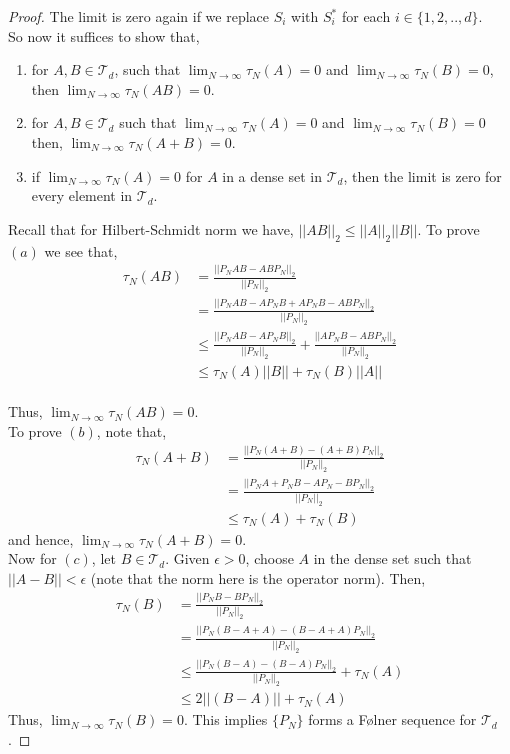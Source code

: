 \documentclass[article]{amsart}
\begin{document}
\begin{proof}
    The limit is zero again if we replace $S_i$ with $S_i^*$ for each $i \in \{1,2,..,d\}$.\\
    
So now it suffices to show that, 
\begin{enumerate}[label=(\alph*)]
\item for $A, B \in \mathcal{T}_d$, such that $\lim_{N\rightarrow \infty} \tau_N(A)=0$ and $\lim_{N\rightarrow \infty} \tau_N(B)=0$, then $\lim_{N \rightarrow \infty} \tau_N(AB)=0$.
\item for $A, B \in \mathcal{T}_d$ such that $\lim_{N\rightarrow \infty} \tau_N(A)=0$ and $\lim_{N\rightarrow \infty} \tau_N(B)=0$ then, $\lim_{N \rightarrow \infty} \tau_N(A+B)=0$.
\item if $\lim_{N\rightarrow \infty} \tau_N(A)=0$ for $A$ in a dense set in $\mathcal{T}_d$, then the limit is zero for every element in $\mathcal{T}_d$.
\end{enumerate}
Recall that for Hilbert-Schmidt norm we have, $||AB||_2 \leq ||A||_2 ||B||$. To prove $(a)$ we see that,
\begin{align*}
    \tau_N(AB) &=  \frac{||P_N AB - AB P_N||_2}{||P_N||_2}\\
    & = \frac{||P_N AB - AP_N B + AP_NB- AB P_N||_2}{||P_N||_2}\\
    & \leq \frac{||P_N AB - AP_N B||_2}{||P_N||_2} + \frac{||AP_N B - ABP_N ||_2}{||P_N||_2}\\
    &  \leq \tau_N(A) ||B|| + \tau_N(B) ||A||
\end{align*}\\
Thus, $\lim_{N \rightarrow \infty} \tau_N(AB)=0$.\\

To prove $(b)$, note that,
\begin{align*}
\tau_N(A+B) & =  \frac{||P_N (A+B) - (A+B) P_N||_2}{||P_N||_2}\\
& =  \frac{||P_N A+ P_NB - A P_N - B P_N||_2}{||P_N||_2}\\
& \leq \tau_N(A) + \tau_N(B)
\end{align*}
and hence, $\lim_{N \rightarrow \infty} \tau_N(A+B)=0$.\\

Now for $(c)$, let $B \in \mathcal{T}_d$. Given $\epsilon >0$, choose $A$ in the dense set such that $||A-B|| < \epsilon$ (note that the norm here is the operator norm). Then,
\begin{align*}
    \tau_N(B) & = \frac{||P_N B - B P_N||_2}{||P_N||_2}\\
    & = \frac{||P_N (B-A+A) -(B-A+A ) P_N||_2}{||P_N||_2}\\
    & \leq \frac{||P_N(B-A) - (B-A)P_N||_2}{||P_N||_2} + \tau_N(A)\\
    & \leq 2 ||(B-A)|| + \tau_N(A)
\end{align*}
Thus, $\lim_{N \rightarrow \infty} \tau_N(B)=0$. This implies $\{P_N\}$ forms a Følner sequence for $\mathcal{T}_d$.
\end{proof}
\end{document}
